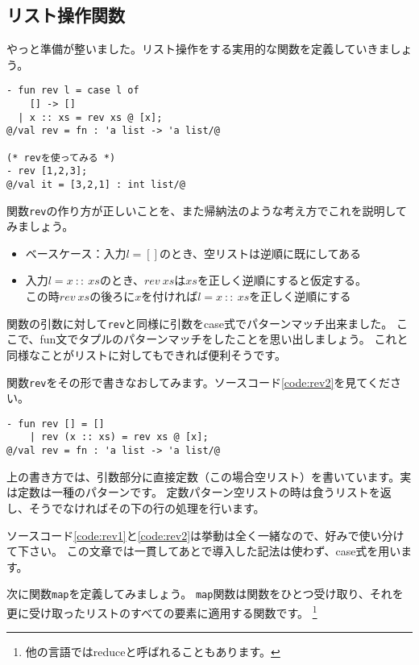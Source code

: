 \documentclass[11pt,a4paper]{article}
\begin{document}
\subsection{リスト操作関数}

やっと準備が整いました。リスト操作をする実用的な関数を定義していきましょう。

\begin{lstlisting}[caption=リストを逆順にする関数revを定義する,label=code:rev1]
- fun rev l = case l of
    [] -> []
  | x :: xs = rev xs @ [x];
@/val rev = fn : 'a list -> 'a list/@

(* revを使ってみる *)
- rev [1,2,3];
@/val it = [3,2,1] : int list/@
\end{lstlisting}

関数\lstinline{rev}の作り方が正しいことを、また帰納法のような考え方でこれを説明してみましょう。
\begin{itemize}
\item ベースケース：入力$l=[]$のとき、空リストは逆順に既にしてある
\item 入力$l = x \ :: \ xs$のとき、$rev \ xs$は$xs$を正しく逆順にすると仮定する。\\
  この時$rev \ xs$の後ろに$x$を付ければ$l = x \ :: \ xs$を正しく逆順にする
\end{itemize}

関数の引数に対して\lstinline{rev}と同様に引数をcase式でパターンマッチ出来ました。
ここで、fun文でタプルのパターンマッチをしたことを思い出しましょう。
これと同様なことがリストに対してもできれば便利そうです。

関数\lstinline{rev}をその形で書きなおしてみます。ソースコード\ref{code:rev2}を見てください。

\begin{lstlisting}[caption=引数部分でのパターンマッチ,label=code:rev2]
- fun rev [] = []
    | rev (x :: xs) = rev xs @ [x];
@/val rev = fn : 'a list -> 'a list/@
\end{lstlisting}

上の書き方では、引数部分に直接定数（この場合空リスト）を書いています。実は定数は一種のパターンです。
定数パターン空リストの時は食うリストを返し、そうでなければその下の行の処理を行います。

ソースコード\ref{code:rev1}と\ref{code:rev2}は挙動は全く一緒なので、好みで使い分けて下さい。
この文章では一貫してあとで導入した記法は使わず、case式を用います。

次に関数\lstinline{map}を定義してみましょう。
\lstinline{map}関数は関数をひとつ受け取り、それを更に受け取ったリストのすべての要素に適用する関数です。
\footnote{他の言語ではreduceと呼ばれることもあります。}
\end{document}

